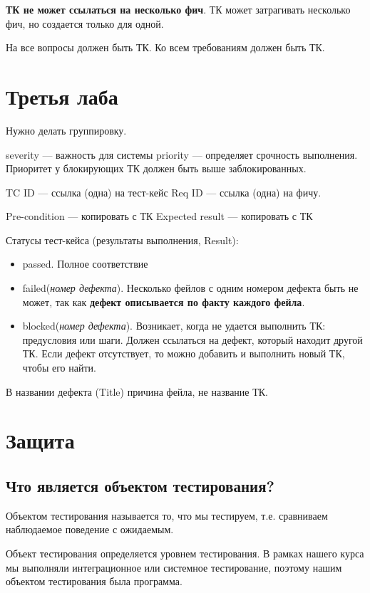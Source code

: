 \textbf{ТК не может ссылаться на несколько фич}. ТК может затрагивать несколько фич, но
создается только для одной.

На все вопросы должен быть ТК. Ко всем требованиям должен быть ТК.

\section{Третья лаба}

Нужно делать группировку.

severity --- важность для системы
priority --- определяет срочность выполнения. Приоритет у блокирующих ТК
должен быть выше заблокированных.

TC ID --- ссылка (одна) на тест-кейс
Req ID --- ссылка (одна) на фичу.

Pre-condition --- копировать с ТК
Expected result --- копировать с ТК

Статусы тест-кейса (результаты выполнения, Result):
\begin{itemize}
    \item passed. Полное соответствие

    \item failed(\textit{номер дефекта}). Несколько фейлов с одним номером
        дефекта быть не может, так как \textbf{дефект описывается по факту каждого
        фейла}.

    \item blocked(\textit{номер дефекта}). Возникает, когда не удается
        выполнить ТК: предусловия или шаги. Должен ссылаться на дефект, который
        находит другой ТК. Если дефект отсутствует, то можно добавить и
        выполнить новый ТК, чтобы его найти.
\end{itemize}

В названии дефекта (Title) причина фейла, не название ТК.

\section{Защита}

\subsection{Что является объектом тестирования?}

Объектом тестирования называется то, что мы тестируем, т.е. сравниваем
наблюдаемое поведение с ожидаемым.

Объект тестирования определяется уровнем тестирования. В рамках нашего курса мы
выполняли интеграционное или системное тестирование, поэтому нашим объектом
тестирования была программа.

